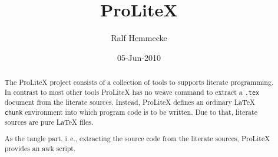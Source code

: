 \documentclass[a4paper]{article} %
\newcommand{\packagename}[1]{{\normalfont\sffamily#1}}
\newcommand\ProLiteX{\textsf{ProLiteX}}
\newcommand{\ie}{i.\,e.}
\begin{document}
\title{\ProLiteX}
\date{05-Jun-2010}
\author{Ralf Hemmecke}
\maketitle
\begin{abstract}
  The \ProLiteX{} project consists of a collection of tools to
  supports literate programming. In contrast to most other tools
  \ProLiteX{} has no weave command to extract a \texttt{.tex} document
  from the literate sources. Instead, \ProLiteX{} defines an ordinary
  \LaTeX{} \texttt{chunk} environment into which program code is to be
  written. Due to that, literate sources are pure \LaTeX{} files.

  As the tangle part, \ie, extracting the source code from the
  literate sources, \ProLiteX{} provides an \packagename{awk} script.
\end{abstract}
\end{document}
